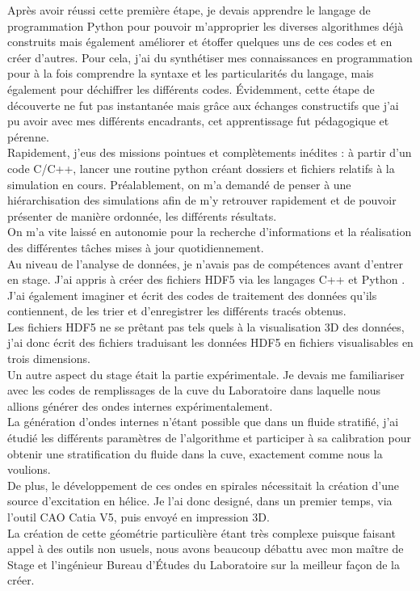\documentclass[french]{article}
\begin{document}
 Après avoir réussi cette première étape, je devais apprendre le langage de programmation Python pour pouvoir m'approprier les diverses algorithmes déjà construits mais également améliorer et étoffer quelques uns de ces codes et en créer d'autres. Pour cela, j'ai du synthétiser mes connaissances en programmation pour à la fois comprendre la syntaxe et les particularités du langage, mais également pour déchiffrer les différents codes. 
 Évidemment, cette étape de découverte ne fut pas instantanée mais grâce aux échanges constructifs que j'ai pu avoir avec mes différents encadrants, cet apprentissage fut pédagogique et pérenne. \\ 
 Rapidement, j'eus des missions pointues et complètements inédites : à partir d'un code C/C++, lancer une routine python créant dossiers et fichiers relatifs à la simulation en cours. Préalablement, on m'a demandé de penser à une hiérarchisation des simulations afin de m'y retrouver rapidement et de pouvoir présenter de manière ordonnée, les différents résultats.\\
 On m'a vite laissé en autonomie pour la recherche d'informations et la réalisation des différentes tâches mises à jour quotidiennement.\\
 Au niveau de l'analyse de données, je n'avais pas de compétences avant d'entrer en stage. J'ai appris à créer des fichiers HDF5 via les langages C++ et Python . J'ai également imaginer et écrit des codes de traitement des données qu'ils contiennent, de les trier et d'enregistrer les différents tracés obtenus.\\
   Les fichiers HDF5 ne se prêtant pas tels quels à la visualisation 3D des données, j'ai donc écrit des fichiers traduisant les données HDF5 en fichiers visualisables en trois dimensions. \\
   
 Un autre aspect du stage était la partie expérimentale. Je devais me familiariser avec les codes de remplissages de la cuve du Laboratoire dans laquelle nous allions générer des ondes internes expérimentalement.\\
    La génération d'ondes internes n'étant possible que dans un fluide stratifié, j'ai étudié les différents paramètres de l'algorithme et participer à sa calibration pour obtenir une stratification du fluide dans la cuve, exactement comme nous la voulions.\\
    De plus, le développement de ces ondes en spirales nécessitait la création d'une source d'excitation en hélice. Je l'ai donc designé, dans un premier temps,  via l'outil CAO Catia V5, puis envoyé en impression 3D.\\
    La création de cette géométrie particulière étant très complexe puisque faisant appel à des outils non usuels, nous avons beaucoup débattu avec mon maître de Stage et l'ingénieur Bureau d'Études du Laboratoire sur la meilleur façon de la créer.\\
    
\end{document}
